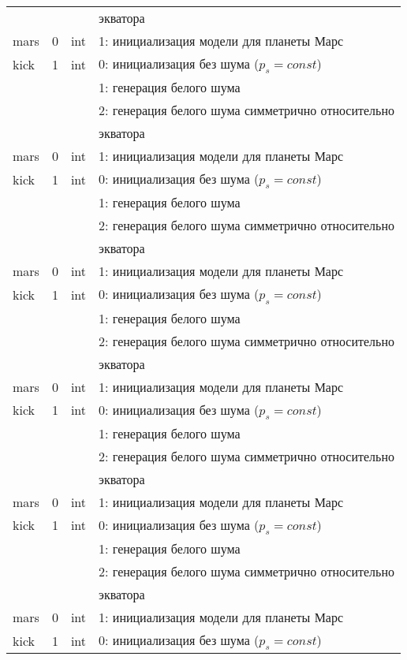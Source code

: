 \begin{longtable*}[c]{|l|c|l|l|}
  & & & экватора    \\
 mars & 0 & int & 1: инициализация модели для планеты Марс     \\
kick & 1 & int & 0: инициализация без шума ($p_s = const$) \\
      &   &     & 1: генерация белого шума                  \\
      &   &     & 2: генерация белого шума симметрично относительно \\
  & & & экватора    \\
 mars & 0 & int & 1: инициализация модели для планеты Марс     \\
kick & 1 & int & 0: инициализация без шума ($p_s = const$) \\
      &   &     & 1: генерация белого шума                  \\
      &   &     & 2: генерация белого шума симметрично относительно \\
  & & & экватора    \\
 mars & 0 & int & 1: инициализация модели для планеты Марс     \\
kick & 1 & int & 0: инициализация без шума ($p_s = const$) \\
      &   &     & 1: генерация белого шума                  \\
      &   &     & 2: генерация белого шума симметрично относительно \\
  & & & экватора    \\
 mars & 0 & int & 1: инициализация модели для планеты Марс     \\
kick & 1 & int & 0: инициализация без шума ($p_s = const$) \\
      &   &     & 1: генерация белого шума                  \\
      &   &     & 2: генерация белого шума симметрично относительно \\
  & & & экватора    \\
 mars & 0 & int & 1: инициализация модели для планеты Марс     \\
kick & 1 & int & 0: инициализация без шума ($p_s = const$) \\
      &   &     & 1: генерация белого шума                  \\
      &   &     & 2: генерация белого шума симметрично относительно \\
  & & & экватора    \\
 mars & 0 & int & 1: инициализация модели для планеты Марс     \\
kick & 1 & int & 0: инициализация без шума ($p_s = const$) \\

\end{longtable*}
